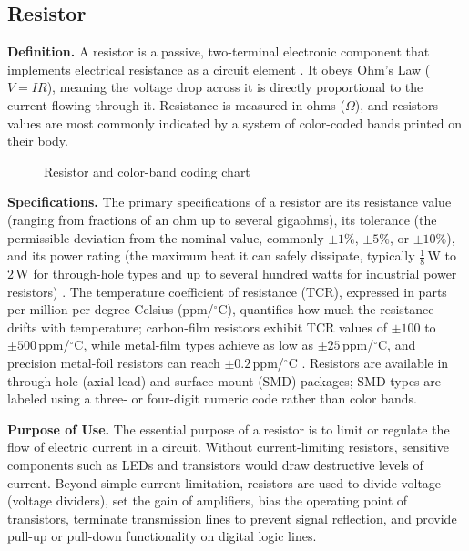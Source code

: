 \documentclass[12pt, a4paper, twoside]{report}
\newcommand{\imgplaceholder}[2]{%
  \begin{figure}[H]
    \centering
    \fcolorbox{gray!60}{gray!12}{%
      \parbox[c][5cm][c]{0.65\textwidth}{%
        \centering
        \textcolor{gray!80}{\Large [Image Placeholder]}\\[6pt]
        \textcolor{gray}{\small Insert figure here}
      }%
    }
    \caption{#1}
    \label{fig:#2}
  \end{figure}
}
\begin{document}
\subsection{Resistor}

\textbf{Definition.}\quad
A resistor is a passive, two-terminal electronic component that implements electrical
resistance as a circuit element \cite{wiki:resistor}. It obeys Ohm's Law ($V = IR$),
meaning the voltage drop across it is directly proportional to the current flowing through
it. Resistance is measured in ohms ($\Omega$), and resistors values are most commonly
indicated by a system of color-coded bands printed on their body.

\imgplaceholder{Resistor and color-band coding chart}{resistor}

\textbf{Specifications.}\quad
The primary specifications of a resistor are its resistance value (ranging from fractions
of an ohm up to several gigaohms), its tolerance (the permissible deviation from the
nominal value, commonly $\pm1\%$, $\pm5\%$, or $\pm10\%$), and its power rating (the
maximum heat it can safely dissipate, typically $\frac{1}{8}$\,W to $2$\,W for through-hole
types and up to several hundred watts for industrial power resistors) \cite{electronics_notes:resistor}.
The temperature coefficient of resistance (TCR), expressed in parts per million per degree
Celsius (ppm/$^\circ$C), quantifies how much the resistance drifts with temperature;
carbon-film resistors exhibit TCR values of $\pm100$ to $\pm500$\,ppm/$^\circ$C, while
metal-film types achieve as low as $\pm25$\,ppm/$^\circ$C, and precision metal-foil
resistors can reach $\pm0.2$\,ppm/$^\circ$C \cite{electronics_notes:resistor}.
Resistors are available in through-hole (axial lead) and surface-mount (SMD) packages;
SMD types are labeled using a three- or four-digit numeric code rather than color bands.

\textbf{Purpose of Use.}\quad
The essential purpose of a resistor is to limit or regulate the flow of electric current
in a circuit. Without current-limiting resistors, sensitive components such as LEDs and
transistors would draw destructive levels of current. Beyond simple current limitation,
resistors are used to divide voltage (voltage dividers), set the gain of amplifiers, bias
the operating point of transistors, terminate transmission lines to prevent signal
reflection, and provide pull-up or pull-down functionality on digital logic lines.
\end{document}
